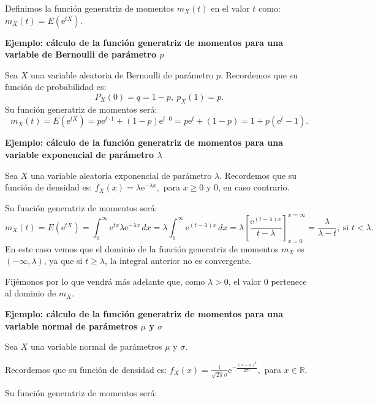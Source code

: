 \documentclass[
  letterpaper,
  DIV=11,
  numbers=noendperiod]{scrreprt}
\begin{document}
Definimos la función generatriz de momentos \(m_X(t)\) en el valor \(t\)
como: \(m_X(t)=E\left(\mathrm{e}^{tX}\right).\)

\textbf{Ejemplo: cálculo de la función generatriz de momentos para una
variable de Bernoulli de parámetro \(p\)}

Sea \(X\) una variable aleatoria de Bernoulli de parámetro \(p\).
Recordemos que su función de probabilidad es: \[
P_X(0)=q=1-p,\ p_X(1)=p.
\] Su función generatriz de momentos será: \[
m_X (t)=E\left(\mathrm{e}^{tX}\right) =p\mathrm{e}^{t\cdot 1}+(1-p)\mathrm{e}^{t\cdot 0}=p\mathrm{e}^t+(1-p)=1+p\left(\mathrm{e}^t -1 \right).
\]

\textbf{Ejemplo: cálculo de la función generatriz de momentos para una
variable exponencial de parámetro \(\lambda\)}

Sea \(X\) una variable aleatoria exponencial de parámetro \(\lambda\).
Recordemos que su función de densidad es:
\(f_X(x)=\lambda \mathrm{e}^{-\lambda x},\) para \(x\geq 0\) y \(0\), en
caso contrario.

Su función generatriz de momentos será: \[
m_X (t)=E\left(\mathrm{e}^{tX}\right)=\int_0^\infty \mathrm{e}^{t x}\lambda \mathrm{e}^{-\lambda x}\, dx = \lambda \int_0^\infty\mathrm{e}^{(t-\lambda)x}\, dx = \lambda\left[\frac{\mathrm{e}^{(t-\lambda)x}}{t-\lambda}\right]_{x=0}^{x=\infty} = \frac{\lambda}{\lambda -t},\ \mbox{si } t<\lambda. 
\] En este caso vemos que el dominio de la función generatriz de
momentos \(m_X\) es \((-\infty,\lambda)\), ya que si \(t\geq \lambda\),
la integral anterior no es convergente.

Fijémonos por lo que vendrá más adelante que, como \(\lambda >0\), el
valor \(0\) pertenece al dominio de \(m_X\).

\textbf{Ejemplo: cálculo de la función generatriz de momentos para una
variable normal de parámetros \(\mu\) y \(\sigma\)}

Sea \(X\) una variable normal de parámetros \(\mu\) y \(\sigma\).

Recordemos que su función de densidad es:
\(f_X(x)=\frac{1}{\sqrt{2\pi}\sigma}\mathrm{e}^{-\frac{(x-\mu)^2}{2\sigma^2}},\)
para \(x\in \mathbb{R}\).

Su función generatriz de momentos será:
\end{document}
